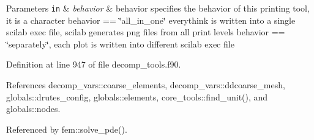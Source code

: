 \begin{DoxyParams}[1]{Parameters}
\mbox{\tt in}  & {\em behavior} & behavior specifies the behavior of this printing tool, it is a character behavior == \char`\"{}all\+\_\+in\+\_\+one\char`\"{} everythink is written into a single scilab exec file, scilab generates png files from all print levels behavior == \char`\"{}separately\char`\"{}, each plot is written into different scilab exec file \\
\hline
\end{DoxyParams}


Definition at line 947 of file decomp\+\_\+tools.\+f90.



References decomp\+\_\+vars\+::coarse\+\_\+elements, decomp\+\_\+vars\+::ddcoarse\+\_\+mesh, globals\+::drutes\+\_\+config, globals\+::elements, core\+\_\+tools\+::find\+\_\+unit(), and globals\+::nodes.



Referenced by fem\+::solve\+\_\+pde().



